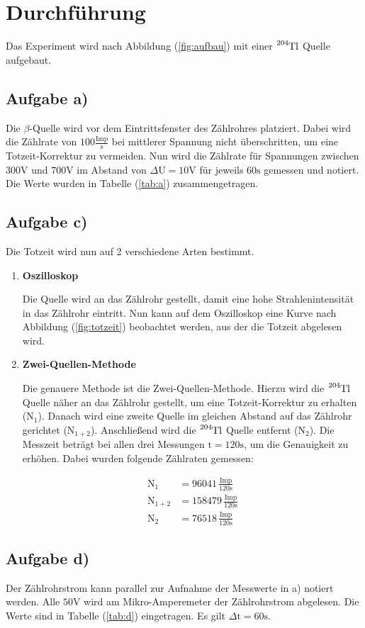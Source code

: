 \section{Durchführung}
Das Experiment wird nach Abbildung (\ref{fig:aufbau}) mit einer $\ce{^{204}Tl}$ Quelle aufgebaut.




\subsection{Aufgabe a)}
Die $\beta$-Quelle wird vor dem Eintrittsfenster des Zählrohres platziert.
Dabei wird die Zählrate von $100\frac{\text{Imp}}{\text{s}}$ bei mittlerer Spannung nicht überschritten, um eine Totzeit-Korrektur zu vermeiden.
Nun wird die Zählrate für Spannungen zwischen $300\si{\volt}$ und $700\si{\volt}$ im Abstand von $\Delta \text{U} =10 \si{\volt}$ für jeweils $60\si{\second}$ gemessen und notiert.
Die Werte wurden in Tabelle (\ref{tab:a}) zusammengetragen.


\subsection{Aufgabe c)}
Die Totzeit wird nun auf 2 verschiedene Arten bestimmt.
\begin{enumerate}
\item \textbf{Oszilloskop}

Die Quelle wird an das Zählrohr gestellt, damit eine hohe Strahlenintensität in das Zählrohr eintritt.
Nun kann auf dem Oszilloskop eine Kurve nach Abbildung (\ref{fig:totzeit}) beobachtet werden, aus der die Totzeit abgelesen wird.

\item \textbf{Zwei-Quellen-Methode}

Die genauere Methode ist die Zwei-Quellen-Methode.
Hierzu wird die $\ce{^{204}Tl}$ Quelle näher an das Zählrohr gestellt, um eine Totzeit-Korrektur zu erhalten ($\text{N}_1$).
Danach wird eine zweite Quelle im gleichen Abstand auf das Zählrohr gerichtet ($\text{N}_{1+2}$).
Anschließend wird die $\ce{^{204}Tl}$ Quelle entfernt ($\text{N}_2$).
Die Messzeit beträgt bei allen drei Messungen $\text{t}=120 \si{\second}$, um die Genauigkeit zu erhöhen.
Dabei wurden folgende Zählraten gemessen:

\begin{align*}
\text{N}_1 &= 96041 \, \frac{\text{Imp}}{120\si{\second}} \\
\text{N}_{1+2} &= 158479 \, \frac{\text{Imp}}{120\si{\second}} \\
\text{N}_2 &= 76518 \, \frac{\text{Imp}}{120\si{\second}}
\label{n:n}
\end{align*}

\end{enumerate}

\subsection{Aufgabe d)}
Der Zählrohrstrom kann parallel zur Aufnahme der Messwerte in a) notiert werden.
Alle $50 \si{\volt}$ wird am Mikro-Amperemeter der Zählrohrstrom abgelesen.
Die Werte sind in Tabelle (\ref{tab:d}) eingetragen.
Es gilt $\Delta \text{t}=60\si{\second}$.